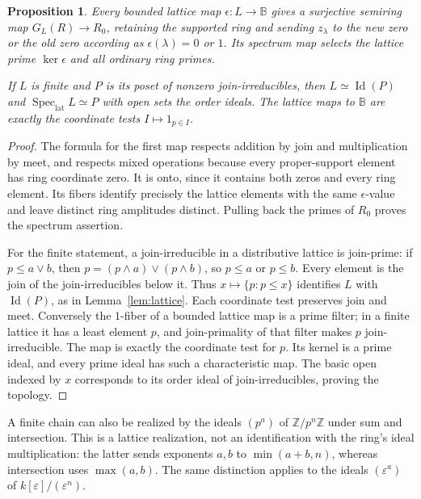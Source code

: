 \documentclass[11pt]{amsart}
\newcommand{\B}{\mathbb B}
\newcommand{\Z}{\mathbb Z}
\DeclareMathOperator{\Spec}{Spec}
\DeclareMathOperator{\Id}{Id}
\newtheorem{proposition}[theorem]{Proposition}
\theoremstyle{definition}
\theoremstyle{remark}
\begin{document}
\begin{proposition}\label{prop:latticebranches}
Every bounded lattice map $\epsilon:L\to\B$ gives a surjective semiring map $G_L(R)\to R_0$, retaining the supported ring and sending $z_\lambda$ to the new zero or the old zero according as $\epsilon(\lambda)=0$ or $1$. Its spectrum map selects the lattice prime $\ker\epsilon$ and all ordinary ring primes.

If $L$ is finite and $P$ is its poset of nonzero join-irreducibles, then $L\simeq\Id(P)$ and $\Spec_{\mathrm{lat}}L\simeq P$ with open sets the order ideals. The lattice maps to $\B$ are exactly the coordinate tests $I\mapsto 1_{p\in I}$.
\end{proposition}
\begin{proof}
The formula for the first map respects addition by join and multiplication by meet, and respects mixed operations because every proper-support element has ring coordinate zero. It is onto, since it contains both zeros and every ring element. Its fibers identify precisely the lattice elements with the same $\epsilon$-value and leave distinct ring amplitudes distinct. Pulling back the primes of $R_0$ proves the spectrum assertion.

For the finite statement, a join-irreducible in a distributive lattice is join-prime: if $p\le a\vee b$, then $p=(p\wedge a)\vee(p\wedge b)$, so $p\le a$ or $p\le b$. Every element is the join of the join-irreducibles below it. Thus $x\mapsto\{p:p\le x\}$ identifies $L$ with $\Id(P)$, as in Lemma~\ref{lem:lattice}. Each coordinate test preserves join and meet. Conversely the $1$-fiber of a bounded lattice map is a prime filter; in a finite lattice it has a least element $p$, and join-primality of that filter makes $p$ join-irreducible. The map is exactly the coordinate test for $p$. Its kernel is a prime ideal, and every prime ideal has such a characteristic map. The basic open indexed by $x$ corresponds to its order ideal of join-irreducibles, proving the topology.
\end{proof}

A finite chain can also be realized by the ideals $(p^a)$ of $\Z/p^n\Z$ under sum and intersection. This is a lattice realization, not an identification with the ring's ideal multiplication: the latter sends exponents $a,b$ to $\min(a+b,n)$, whereas intersection uses $\max(a,b)$. The same distinction applies to the ideals $(\varepsilon^a)$ of $k[\varepsilon]/(\varepsilon^n)$.
\end{document}

